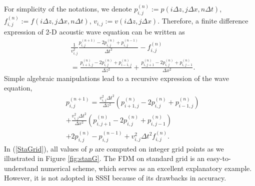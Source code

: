\documentclass[11pt]{article}
\theoremstyle{plain}
\theoremstyle{definition}
\theoremstyle{remark}
\numberwithin{equation}{section}
\begin{document}
For simplicity of the notations, we denote $p_{i,j}^{(n)}:=  p(i\Delta z, j\Delta x, n\Delta t)$, $f_{i,j}^{(n)} := f(i\Delta z, j\Delta x, n\Delta t)$, $v_{i,j} := v(i\Delta z, j\Delta x)$.
 Therefore, a finite difference expression of 2-D acoustic wave equation can be written as 
  \begin{equation}
    \begin{aligned}
    &\frac{1}{v_{i,j}^2}\frac{p_{i,j}^{(n+1)} - 2p_{i,j}^{(n)} + p_{i,j}^{(n-1)}}{\Delta t^2} - f_{i,j}^{(n)} \\
    &= \frac{p_{i+1,j}^{(n)} - 2p_{i,j}^{(n)} + p_{i-1,j}^{(n)}}{\Delta z^2} + \frac{p_{i,j+1}^{(n)} - 2p_{i,j}^{(n)} + p_{i,j-1}^{(n)}}{\Delta x^2}.
    \end{aligned}
  \end{equation}
Simple algebraic manipulations lead to a recursive expression of the wave equation,
  \begin{equation}\label{StaGrid}
    \begin{aligned}
    &p_{i,j}^{(n+1)} = \frac{v_{i,j}^2\Delta t^2}{\Delta z^2}\left(p_{i+1,j}^{(n)} - 2p_{i,j}^{(n)} + p_{i-1,j}^{(n)}\right)\\
    &+ \frac{v_{i,j}^2\Delta t^2}{\Delta x^2}\left(p_{i,j+1}^{(n)} - 2p_{i,j}^{(n)} + p_{i,j-1}^{(n)}\right)\\
    &+ 2p_{i,j}^{(n)}-p_{i,j}^{(n-1)} + v_{i,j}^2\Delta t^2 f_{i,j}^{(n)}.
    \end{aligned}
  \end{equation}
  In (\ref{StaGrid}), all values of $p$ are computed on integer grid points as we illustrated in Figure \ref{fig:stanG}. The FDM on standard grid is an easy-to-understand numerical scheme, which serves as an excellent explanatory example. However, it is not adopted in SSSI because of its drawbacks in accuracy.  
  
\end{document}
